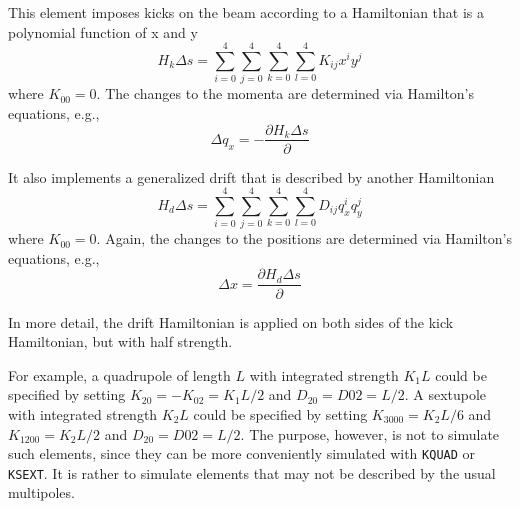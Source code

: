 This element imposes kicks on the beam according
to a Hamiltonian that is a polynomial function of x and y 
\begin{equation}
H_k\Delta s = \sum_{i=0}^{4} \sum_{j=0}^{4} \sum_{k=0}^4 \sum_{l=0}^4 K_{ij} x^i y^j 
\end{equation}
where $K_{00} = 0$.
The changes to the momenta are determined via Hamilton's equations, e.g.,
\begin{equation}
\Delta q_x = -\frac{\partial H_k\Delta s}{\partial}
\end{equation}

It also implements a generalized drift that is described by another Hamiltonian
\begin{equation}
H_d\Delta s = \sum_{i=0}^{4} \sum_{j=0}^{4} \sum_{k=0}^4 \sum_{l=0}^4 D_{ij} q_x^i q_y^j 
\end{equation}
where $K_{00} = 0$.
Again, the changes to the positions are determined via Hamilton's equations, e.g., 
\begin{equation}
\Delta x = \frac{\partial H_d\Delta s}{\partial}
\end{equation}

In more detail, the drift Hamiltonian is applied on both sides of the kick Hamiltonian, but with
half strength. 

For example, a quadrupole of length $L$ with integrated strength $K_1 L$  could be specified by setting
$K_{20} = -K_{02} = K_1 L/2$ and $D_20 = D02 = L/2$.
A sextupole with integrated strength $K_2 L$ could be specified by setting $K_{3000} = K_2 L/6$ and $K_{1200} = K_2 L/2$
and $D_20 = D02 = L/2$.
The purpose, however, is not to simulate such elements, since they can be more conveniently simulated with 
\verb|KQUAD| or \verb|KSEXT|.
It is rather to simulate elements that may not be described by the usual multipoles.